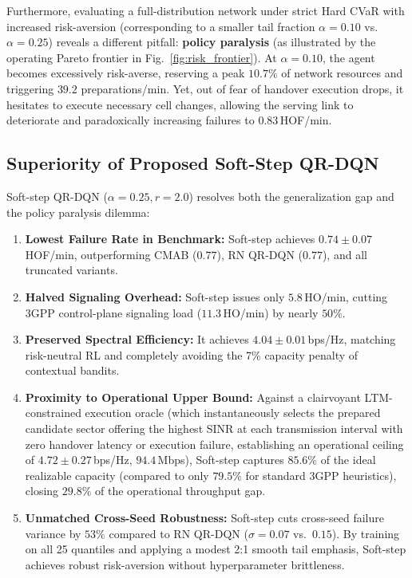 \documentclass{ieeetmlcn}
\begin{document}
Furthermore, evaluating a full-distribution network under strict Hard CVaR with increased risk-aversion (corresponding to a smaller tail fraction $\alpha=0.10$ vs.\ $\alpha=0.25$) reveals a different pitfall: \textbf{policy paralysis} (as illustrated by the operating Pareto frontier in Fig.~\ref{fig:risk_frontier}). At $\alpha=0.10$, the agent becomes excessively risk-averse, reserving a peak $10.7\%$ of network resources and triggering $39.2$ preparations/min. Yet, out of fear of handover execution drops, it hesitates to execute necessary cell changes, allowing the serving link to deteriorate and paradoxically increasing failures to $0.83$\,HOF/min.

\subsection{Superiority of Proposed Soft-Step QR-DQN}
\label{sec:results-softstep}
Soft-step QR-DQN ($\alpha=0.25, r=2.0$) resolves both the generalization gap and the policy paralysis dilemma:
\begin{enumerate}
    \item \textbf{Lowest Failure Rate in Benchmark:} Soft-step achieves $\mathbf{0.74 \pm 0.07}$\,HOF/min, outperforming CMAB ($0.77$), RN QR-DQN ($0.77$), and all truncated variants.
    \item \textbf{Halved Signaling Overhead:} Soft-step issues only $5.8$\,HO/min, cutting 3GPP control-plane signaling load ($11.3$\,HO/min) by nearly $50\%$.
    \item \textbf{Preserved Spectral Efficiency:} It achieves $\mathbf{4.04 \pm 0.01}$\,bps/Hz, matching risk-neutral RL and completely avoiding the 7\% capacity penalty of contextual bandits.
    \item \textbf{Proximity to Operational Upper Bound:} Against a clairvoyant LTM-constrained execution oracle (which instantaneously selects the prepared candidate sector offering the highest SINR at each transmission interval with zero handover latency or execution failure, establishing an operational ceiling of $4.72 \pm 0.27$\,bps/Hz, $94.4$\,Mbps), Soft-step captures $85.6\%$ of the ideal realizable capacity (compared to only $79.5\%$ for standard 3GPP heuristics), closing $29.8\%$ of the operational throughput gap.
    \item \textbf{Unmatched Cross-Seed Robustness:} Soft-step cuts cross-seed failure variance by $53\%$ compared to RN QR-DQN ($\sigma = 0.07$ vs.\ $0.15$). By training on all 25 quantiles and applying a modest 2:1 smooth tail emphasis, Soft-step achieves robust risk-aversion without hyperparameter brittleness.
\end{enumerate}
\end{document}
